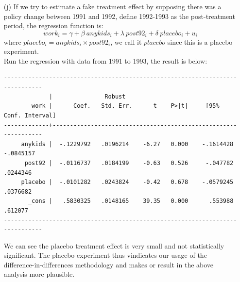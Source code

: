 \documentclass{article}
\begin{document}
\begin{enumerate}
\newpage

\item[(j)] If we try to estimate a fake treatment effect by supposing there was a policy change between 1991 and 1992,  define 1992-1993 as the post-treatment period, the regression function is:
$$ work_i = \gamma + \beta\ anykids_i + \lambda\ post92_i + \delta\ placebo_i + u_i $$
where $placebo_i = anykids_i \times post92_i$, we call it $placebo$ since this is a placebo experiment. \\

Run the regression with data from 1991 to 1993, the result is below:

\begin{verbatim}
------------------------------------------------------------------------------
             |               Robust
        work |      Coef.   Std. Err.      t    P>|t|     [95% Conf. Interval]
-------------+----------------------------------------------------------------
     anykids |  -.1229792   .0196214    -6.27   0.000    -.1614428   -.0845157
      post92 |  -.0116737   .0184199    -0.63   0.526     -.047782    .0244346
     placebo |  -.0101282   .0243824    -0.42   0.678    -.0579245    .0376682
       _cons |   .5830325   .0148165    39.35   0.000      .553988     .612077
------------------------------------------------------------------------------
\end{verbatim}

We can see the placebo treatment effect is very small and not statistically significant.
The placebo experiment thus vindicates our usage of the difference-in-differences methodology 
and makes or result in the above analysis more plausible. 
\end{enumerate}


\newpage
\end{document}
